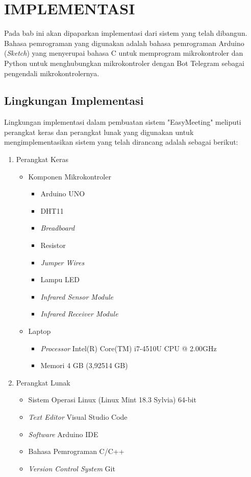 \chapter{IMPLEMENTASI}
\tab Pada bab ini akan dipaparkan implementasi dari sistem yang telah dibangun. Bahasa pemrograman yang digunakan adalah bahasa pemrograman Arduino (\textit{Sketch}) yang menyerupai bahasa C untuk memprogram mikrokontroler dan Python untuk menghubungkan mikrokontroler dengan Bot Telegram sebagai pengendali mikrokontrolernya.

\section{Lingkungan Implementasi}
\tab Lingkungan implementasi dalam pembuatan sistem "EasyMeeting" meliputi perangkat keras dan perangkat lunak yang digunakan untuk mengimplementasikan sistem yang telah dirancang adalah sebagai berikut:
\begin{enumerate}
	\item Perangkat Keras
	\begin{itemize}
		\item Komponen Mikrokontroler
		\begin{itemize}
			\item Arduino UNO
			\item DHT11
			\item \textit{Breadboard}
			\item Resistor
			\item \textit{Jumper Wires}
			\item Lampu LED
			\item \textit{Infrared Sensor Module}
			\item \textit{Infrared Receiver Module}
		\end{itemize}
		\item Laptop
		\begin{itemize}
			\item \textit{Processor} Intel(R) Core(TM) i7-4510U CPU @ 2.00GHz
			\item Memori 4 GB (3,92514 GB)
		\end{itemize}
	\end{itemize}
	\item Perangkat Lunak
	\begin{itemize}
		\item Sistem Operasi Linux (Linux Mint 18.3 Sylvia)
		 64-bit
		\item \textit{Text Editor} Visual Studio Code
		\item \textit{Software} Arduino IDE
		\item Bahasa Pemrograman C/C++
		\item \textit{Version Control System} Git
	\end{itemize}
\end{enumerate}

